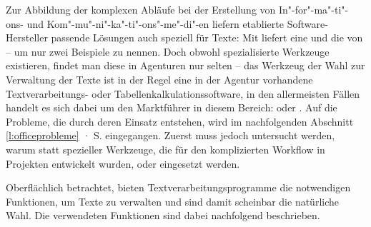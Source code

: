 Zur Abbildung der komplexen Abläufe bei der Erstellung von In"-for"-ma"-ti"-ons- und Kom"-mu"-ni"-ka"-ti"-ons"-me"-di"-en liefern etablierte Software-Hersteller passende Lösungen auch speziell für Texte: Mit  liefert  eine  \cite{adobeincopy} und  die  von   \cite{woodwing} -- um nur zwei Beispiele zu nennen. Doch obwohl spezialisierte Werkzeuge existieren, findet man diese in Agenturen nur selten -- das Werkzeug der Wahl zur Verwaltung der Texte ist in der Regel eine in der Agentur vorhandene Textverarbeitungs- oder Tabellenkalkulationssoftware, in den allermeisten Fällen handelt es sich dabei um den Marktführer in diesem Bereich:   oder . Auf die Probleme, die durch deren Einsatz entstehen, wird im nachfolgenden Abschnitt \ref{l:officeprobleme} · S.\pageref{l:officeprobleme} eingegangen. Zuerst muss jedoch untersucht werden, warum statt spezieller Werkzeuge, die für den komplizierten Workflow in Projekten entwickelt wurden,  oder  eingesetzt werden.

\bigskip

Oberflächlich betrachtet, bieten Textverarbeitungsprogramme die notwendigen Funktionen, um Texte zu verwalten und sind damit scheinbar die natürliche Wahl. Die verwendeten Funktionen sind dabei nachfolgend beschrieben.

